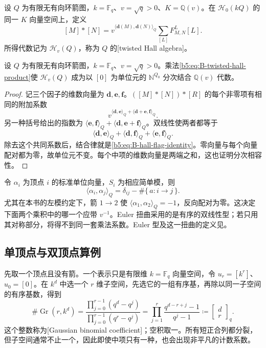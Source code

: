\begin{definition}\label{b5:def:B-twisted-hall}
	设 \(Q\) 为有限无有向环箭图，\(k=\mathbb F_q\)、\(v=\sqrt q>0\)、\(K=\mathbb Q(v)\)。在 \(\mathcal H_0(kQ)\) 的同一 \(K\) 向量空间上，定义
	\begin{equation}\label{b5:eq:B-twisted-hall-product}
		[M]*[N]
		=v^{\langle\mathbf d(M),\mathbf d(N)\rangle_Q}
		\sum_{[L]}F_{M,N}^{L}[L].
	\end{equation}
	所得代数记为 \(\mathcal H_v(Q)\)，称为 \(Q\) 的[twisted Hall algebra]。
\end{definition}

\begin{proposition}\label{b5:prop:B-hall-twist-associativity}
	设 \(Q\) 为有限无有向环箭图，\(k=\mathbb F_q\)、\(v=\sqrt q>0\)。乘法\eqref{b5:eq:B-twisted-hall-product}使 \(\mathcal H_v(Q)\) 成为以 \([0]\) 为单位元的 \(\mathbb N^{Q_0}\) 分次结合 \(\mathbb Q(v)\) 代数。
\end{proposition}
\begin{proof}
	记三个因子的维数向量为 \(\mathbf d,\mathbf e,\mathbf f\)。\(([M]*[N])*[R]\) 的每个非零项有相同的附加系数
	\[
		v^{\langle\mathbf d,\mathbf e\rangle_Q+
		\langle\mathbf d+\mathbf e,\mathbf f\rangle_Q}.
	\]
	另一种括号给出的指数为 \(\langle\mathbf e,\mathbf f\rangle_Q+\langle\mathbf d,\mathbf e+\mathbf f\rangle_Q\)。双线性使两者都等于
	\[
		\langle\mathbf d,\mathbf e\rangle_Q+
		\langle\mathbf d,\mathbf f\rangle_Q+
		\langle\mathbf e,\mathbf f\rangle_Q.
	\]
	除去这个共同系数后，结合律就是\eqref{b5:eq:B-hall-flag-identity}。零向量与每个向量配对都为零，故单位元不变。每个中项的维数向量是两端之和，这也证明分次相容性。
\end{proof}
令 \(\alpha_i\) 为顶点 \(i\) 的标准单位向量，\(S_i\) 为相应简单模，则
\[
	\langle\alpha_i,\alpha_j\rangle_Q
	=\delta_{ij}-\#\{\,a:i\to j\,\}.
\]
尤其在本书的左模约定下，箭 \(1\to2\) 使 \(\langle\alpha_1,\alpha_2\rangle_Q=-1\)，反向配对为零。这决定下面两个乘积中的哪一个应带 \(v^{-1}\)。Euler 扭曲采用的是有序的双线性型；若只用其对称部分，将得不到同一套乘法系数。Euler 型及这一扭曲的定义见\cite[作者公开稿, Sections 1.2--1.3]{Schiffmann2012HallAlgebras}。

\subsection{单顶点与双顶点算例}
\label{b5:subsec:B06:03}

先取一个顶点且没有箭。一个表示只是有限维 \(k=\mathbb F_q\) 向量空间，令 \(u_r=[k^r]\)、\(u_0=[0]\)。在 \(k^d\) 中选一个 \(r\) 维子空间，先选它的一组有序基，再除以同一子空间的有序基数，得到
\[
	\#\operatorname{Gr}(r,k^d)
	=\frac{\prod_{j=0}^{r-1}(q^d-q^j)}{\prod_{j=0}^{r-1}(q^r-q^j)}
	=\prod_{j=1}^{r}\frac{q^{d-r+j}-1}{q^j-1}
	\coloneqq\begin{bmatrix}d\\r\end{bmatrix}_q.
\]
这个整数称为[Gaussian binomial coefficient]；空积取一。所有短正合列都分裂，但子空间通常不止一个，因此即使中项只有一种，也会出现非平凡的计数系数。

